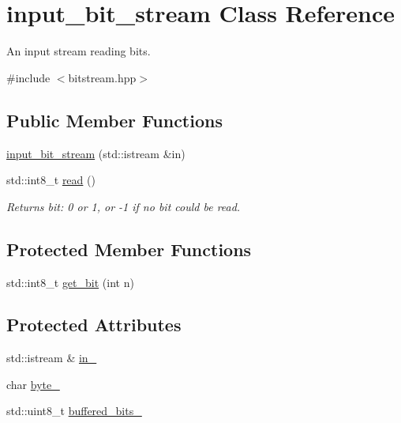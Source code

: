 \hypertarget{classinput__bit__stream}{}\section{input\+\_\+bit\+\_\+stream Class Reference}
\label{classinput__bit__stream}


An input stream reading bits.  




{\ttfamily \#include $<$bitstream.\+hpp$>$}

\subsection*{Public Member Functions}
\begin{DoxyCompactItemize}
\item 
\mbox{\hyperlink{classinput__bit__stream_af03beded61deb6ba4b28ef3ec1c07e7a}{input\+\_\+bit\+\_\+stream}} (std\+::istream \&in)
\item 
std\+::int8\+\_\+t \mbox{\hyperlink{classinput__bit__stream_a56eb1da62277c49638b3d6a60fbda99c}{read}} ()
\begin{DoxyCompactList}\small\item\em Returns bit\+: 0 or 1, or -\/1 if no bit could be read. \end{DoxyCompactList}\end{DoxyCompactItemize}
\subsection*{Protected Member Functions}
\begin{DoxyCompactItemize}
\item 
std\+::int8\+\_\+t \mbox{\hyperlink{classinput__bit__stream_a71ef59dca0ee93ab4efe5594689b40c7}{get\+\_\+bit}} (int n)
\end{DoxyCompactItemize}
\subsection*{Protected Attributes}
\begin{DoxyCompactItemize}
\item 
std\+::istream \& \mbox{\hyperlink{classinput__bit__stream_a276979d5f49658e7aed99199e42ecc2d}{in\+\_\+}}
\item 
char \mbox{\hyperlink{classinput__bit__stream_a93a73d4ecb7f3798da5abe2e095b4556}{byte\+\_\+}}
\item 
std\+::uint8\+\_\+t \mbox{\hyperlink{classinput__bit__stream_acfaf81e807b2026e70b2d6c8af57f454}{buffered\+\_\+bits\+\_\+}}
\end{DoxyCompactItemize}


